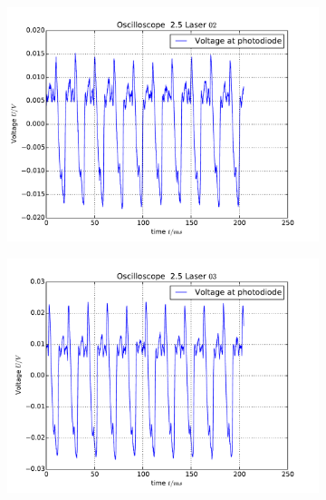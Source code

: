 \begin{figure}
    \begin{subfigure}[b]{\picwidth}
        \includegraphics[width=\textwidth]{analysis/figures/25_laser02}
        \caption{}
        \label{fig:laser_c}
    \end{subfigure}
    \begin{subfigure}[b]{\picwidth}
        \includegraphics[width=\textwidth]{analysis/figures/25_laser03}
        \caption{}
        \label{fig:laser_d}
    \end{subfigure}
    \begin{subfigure}[b]{\picwidth}

\end{subfigure}
\end{figure}
